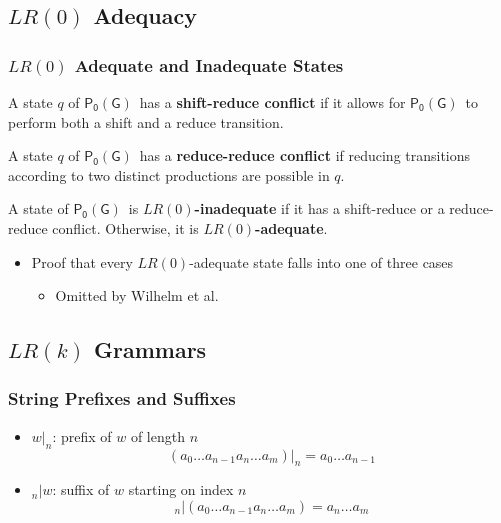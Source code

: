 \documentclass{beamer}
\newcommand{\concept}[1]{\textbf{#1}}
\newcommand{\parser}{\ensuremath{\mathsf{P_0(G)}}}
\begin{document}
\subsection{$LR(0)$ Adequacy}

\begin{frame}
  \frametitle{$LR(0)$ Adequate and Inadequate States}
  \begin{definition}
    A state $q$ of \parser\ has a \concept{shift-reduce conflict} if 
    it allows for \parser\ to perform both a shift and a reduce transition.
  \end{definition}
  \begin{definition}
    A state $q$ of \parser\ has a \concept{reduce-reduce conflict} if 
    reducing transitions according to two distinct productions are possible in $q$.
  \end{definition}
  \begin{definition}[$LR(0)$-adequacy]
    A state of \parser\ is \concept{$LR(0)$-inadequate} if it has a shift-reduce
    or a reduce-reduce conflict. Otherwise, it is \concept{$LR(0)$-adequate}.
  \end{definition}
  \pause
  \begin{itemize}
    \item Proof that every $LR(0)$-adequate state falls into one of three cases
    \begin{itemize}
      \item Omitted by Wilhelm et al.
    \end{itemize}
  \end{itemize}
\end{frame}

\subsection{$LR(k)$ Grammars}

\begin{frame}
  \frametitle{String Prefixes and Suffixes}
  \begin{itemize}
    \item $w|_n$: prefix of $w$ of length $n$
    \[(a_0 \ldots a_{n-1} a_n \ldots a_m)|_n = a_0 \ldots a_{n-1}\]
    \item ${}_n|w$: suffix of $w$ starting on index $n$ 
    \[{}_n|(a_0 \ldots a_{n-1} a_n \ldots a_m) = a_n \ldots a_{m}\]
  \end{itemize}
\end{frame}
\end{document}
